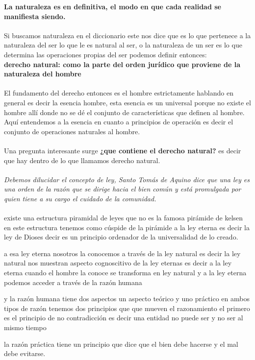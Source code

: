 \documentclass[12pt]{book}
\begin{document}
\textbf{La naturaleza es en definitiva, el modo en que cada realidad se manifiesta siendo.}
\\ \\
Si buscamos naturaleza en el diccionario este nos dice que es lo que pertenece a la naturaleza del ser lo que le es natural al ser, o la naturaleza de un ser es lo que determina las operaciones propias del ser
podemos definir entonces:
\\
\textbf{derecho natural: como la parte del orden jurídico que proviene de la naturaleza del hombre}
\\ \\
El fundamento del derecho entonces es el hombre estrictamente hablando en general es decir la esencia hombre, esta esencia es un universal porque no existe el hombre allí donde no se dé el conjunto de características que definen al hombre.
\\
Aquí entendemos a la esencia en cuanto a principios de operación es decir el conjunto de operaciones naturales al hombre.
\\ \\
Una pregunta interesante surge \textbf{¿que contiene el derecho natural?} es decir que hay dentro de lo que llamamos derecho natural.\\ \\
\textit{Debemos dilucidar el concepto de ley, Santo Tomás de Aquino dice que una ley es una orden de la razón que se dirige hacia el bien común y está promulgada por quien tiene a su cargo el cuidado de la comunidad.
}
\\ \\
existe una estructura piramidal de leyes que no es la famosa pirámide de kelsen en este estructura tenemos como cúspide de la pirámide a la ley eterna es decir la ley de Dioses decir es un principio ordenador de la universalidad de lo creado.

a esa ley eterna nosotros la conocemos a través de la ley natural es decir la ley natural nos muestran aspecto cognoscitivo de la ley eternas es decir a la ley eterna cuando el hombre la conoce se transforma en ley natural y a la ley eterna podemos acceder a través de la razón humana

y la razón humana tiene dos aspectos un aspecto teórico y uno práctico
en ambos tipos de razón tenemos dos principios que que mueven el razonamiento el primero es el principio de no contradicción es decir una entidad no puede ser y no ser al mismo tiempo

la razón práctica tiene un principio que dice que el bien debe hacerse y el mal debe evitarse.
\end{document}
